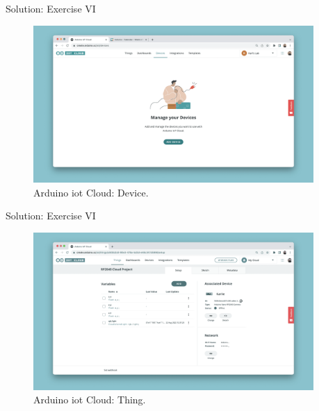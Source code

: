 \begin{frame}{Solution: Exercise VI}
    \begin{figure}
        \includegraphics[width=0.95\textwidth]{images/microcontroller/iot-cloud/devices.png}
        \caption{Arduino\textregistered{} \acs{iot} Cloud: Device.}
    \end{figure}
\end{frame}

\begin{frame}{Solution: Exercise VI}
    \begin{figure}
        \includegraphics[width=0.95\textwidth]{images/microcontroller/iot-cloud/things.png}
        \caption{Arduino\textregistered{} \acs{iot} Cloud: Thing.}
    \end{figure}
\end{frame}

